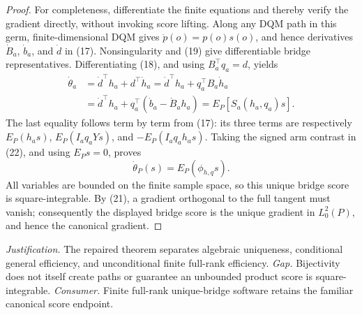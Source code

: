 \documentclass{article}
\begin{document}
\begin{proof}
For completeness, differentiate the finite equations and thereby verify the gradient directly, without invoking score lifting.  Along any DQM path in this germ, finite-dimensional DQM gives
\(\dot p(o)=p(o)s(o)\), and hence derivatives \(\dot B_a\), \(\dot b_a\), and \(\dot d\) in (17).  Nonsingularity and (19) give differentiable bridge representatives.  Differentiating (18), and using \(B_a^\top q_a=d\), yields
\[
 \begin{aligned}
 \dot\theta_a
 &=\dot d^\top h_a+d^\top\dot h_a
 =\dot d^\top h_a+q_a^\top B_a\dot h_a\\
 &=\dot d^\top h_a+q_a^\top(\dot b_a-\dot B_ah_a)
 =E_P[S_a(h_a,q_a)s].                                               \tag{22}
 \end{aligned}
\]
The last equality follows term by term from (17): its three terms are respectively \(E_P(h_as)\), \(E_P(I_aq_aYs)\), and \(-E_P(I_aq_ah_as)\).  Taking the signed arm contrast in (22), and using \(E_Ps=0\), proves
\[
 \dot\theta_P(s)=E_P(\phi_{h,q}s).
\]
All variables are bounded on the finite sample space, so this unique bridge score is square-integrable.  By (21), a gradient orthogonal to the full tangent must vanish; consequently the displayed bridge score is the unique gradient in \(L_0^2(P)\), and hence the canonical gradient.
\end{proof}
\par\smallskip\noindent \textit{Justification.} The repaired theorem separates algebraic uniqueness, conditional general efficiency, and unconditional finite full-rank efficiency. \textit{Gap.} Bijectivity does not itself create paths or guarantee an unbounded product score is square-integrable. \textit{Consumer.} Finite full-rank unique-bridge software retains the familiar canonical score endpoint.
\end{document}
